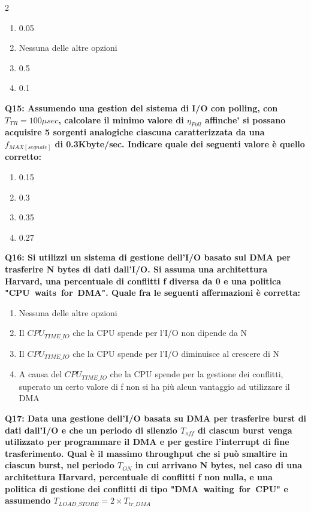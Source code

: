 \documentclass[10pt]{article}
\begin{document}
\begin{multicols}{2}
\begin{enumerate}[label=\arabic*.]
\item 0.05
\item Nessuna delle altre opzioni
\item 0.5
\item 0.1
\end{enumerate}
\textbf{Q15: Assumendo una gestion del sistema di I/O con polling, con $T_{TR}=100\mu sec$, calcolare il minimo valore di $\eta_{Poll}$ affinche' si possano acquisire 5 sorgenti analogiche ciascuna caratterizzata da una $f_{MAX[segnale]}$ di 0.3Kbyte/sec.  Indicare quale dei seguenti valore è quello corretto:}

\begin{enumerate}[label=\arabic*.]
\item 0.15
\item 0.3
\item 0.35
\item 0.27
\end{enumerate}
\textbf{Q16: Si utilizzi un sistema di gestione dell’I/O basato sul DMA per trasferire N bytes di dati dall’I/O. Si assuma una architettura Harvard, una percentuale di conflitti f diversa da 0 e una politica "CPU waits for DMA". Quale fra le seguenti affermazioni è corretta:}

\begin{enumerate}[label=\arabic*.]
\item Nessuna delle altre opzioni
\item Il $CPU_{TIME\_IO}$ che la CPU spende per l’I/O non dipende da N
\item Il $CPU_{TIME\_IO}$ che la CPU spende per l’I/O diminuisce al crescere di N
\item A causa del $CPU_{TIME\_IO}$ che la CPU spende per la gestione dei conflitti, superato un certo valore di f non si ha più alcun vantaggio ad utilizzare il DMA
\end{enumerate}
\textbf{Q17: Data una gestione dell’I/O basata su DMA per trasferire burst di dati dall’I/O e che un periodo di silenzio $T_{off}$ di ciascun burst venga utilizzato per programmare il DMA e per gestire l’interrupt di fine trasferimento. Qual è il massimo throughput che si può smaltire in ciascun burst, nel periodo $T_{ON}$ in cui arrivano N bytes, nel caso di una architettura Harvard, percentuale di conflitti f non nulla, e una politica di gestione dei conflitti di tipo "DMA waiting for CPU" e assumendo $T_{LOAD\_STORE} = 2 \times T_{tr\_DMA}$}


\end{multicols}
\end{document}
